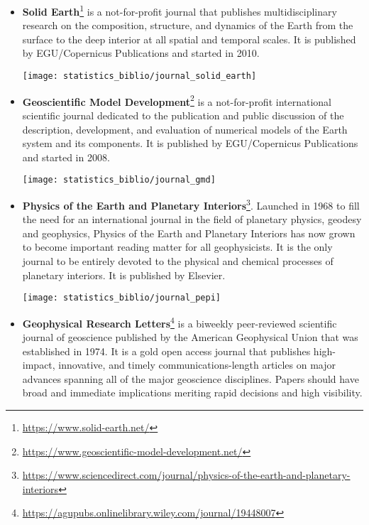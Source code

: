 \begin{itemize}
\item {\bf Solid Earth}\footnote{\url{https://www.solid-earth.net/}}
is a not-for-profit journal that publishes multidisciplinary research on the 
composition, structure, and dynamics of the Earth from the surface to the 
deep interior at all spatial and temporal scales. 
It is published by EGU/Copernicus Publications and started in 2010.

\begin{center}
\texttt{[image: statistics\_biblio/journal\_solid\_earth]}
\end{center}

\item {\bf Geoscientific Model Development}\footnote{\url{https://www.geoscientific-model-development.net/}}
is a not-for-profit international scientific journal dedicated to the publication 
and public discussion of the description, development, and evaluation of numerical models 
of the Earth system and its components.
It is published by EGU/Copernicus Publications and started in 2008.

\begin{center}
\texttt{[image: statistics\_biblio/journal\_gmd]}
\end{center}

\item {\bf Physics of the Earth and Planetary Interiors}\footnote{\url{https://www.sciencedirect.com/journal/physics-of-the-earth-and-planetary-interiors}}.
Launched in 1968 to fill the need for an international journal in the field of 
planetary physics, geodesy and geophysics, Physics of the Earth and Planetary Interiors 
has now grown to become important reading matter for all geophysicists. It is the only 
journal to be entirely devoted to the physical and chemical processes of planetary interiors.
It is published by Elsevier.

\begin{center}
\texttt{[image: statistics\_biblio/journal\_pepi]}
\end{center}

\item {\bf Geophysical Research Letters}\footnote{\url{https://agupubs.onlinelibrary.wiley.com/journal/19448007}} 
is a biweekly peer-reviewed scientific journal of 
geoscience published by the American Geophysical Union that was established in 1974.
It is a gold open access journal that publishes high-impact, innovative, and timely 
communications-length articles on major advances spanning all of the major geoscience disciplines. 
Papers should have broad and immediate implications meriting rapid decisions and high visibility.


\end{itemize}
